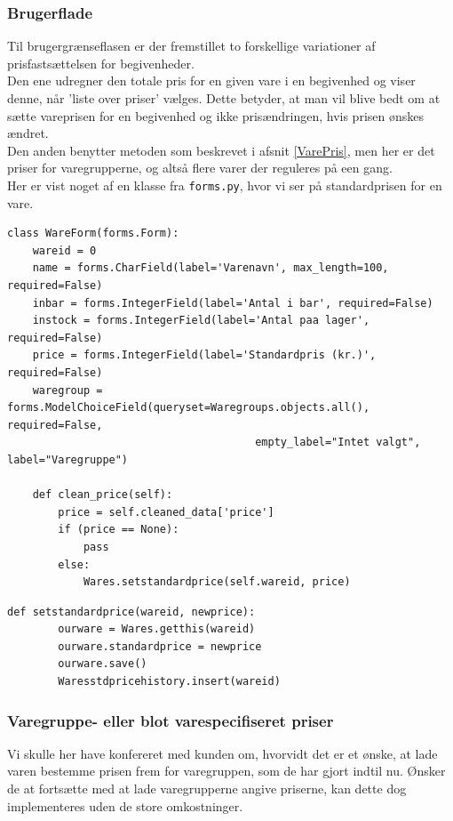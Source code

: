 \documentclass[]{article}
\begin{document}
\subsubsection{Brugerflade}
\noindent  Til brugergrænseflasen er der fremstillet to forskellige variationer af prisfastsættelsen for begivenheder. \\
Den ene udregner den totale pris for en given vare i en begivenhed og viser denne, når 'liste over priser' vælges. Dette betyder, at man vil blive bedt om at sætte vareprisen for en begivenhed og ikke prisændringen, hvis prisen ønskes ændret. \\
Den anden benytter metoden som beskrevet i afsnit \ref{VarePris}, men her er det priser for varegrupperne, og altså flere varer der reguleres på een gang. \\
Her er vist noget af en klasse fra \texttt{forms.py}, hvor vi ser på standardprisen for en vare.
\begin{lstlisting}
class WareForm(forms.Form):
    wareid = 0
    name = forms.CharField(label='Varenavn', max_length=100, required=False)
    inbar = forms.IntegerField(label='Antal i bar', required=False)
    instock = forms.IntegerField(label='Antal paa lager', required=False)
    price = forms.IntegerField(label='Standardpris (kr.)', required=False)
    waregroup = forms.ModelChoiceField(queryset=Waregroups.objects.all(), required=False, 
                                       empty_label="Intet valgt", label="Varegruppe")

    def clean_price(self):
        price = self.cleaned_data['price']
        if (price == None):
            pass
        else:
            Wares.setstandardprice(self.wareid, price)

\end{lstlisting}

\begin{lstlisting}
def setstandardprice(wareid, newprice):
        ourware = Wares.getthis(wareid)
        ourware.standardprice = newprice
        ourware.save()
        Waresstdpricehistory.insert(wareid)
\end{lstlisting}

\subsubsection{Varegruppe- eller blot varespecifiseret priser}
\noindent Vi skulle her have konfereret med kunden om, hvorvidt det er et ønske, at lade varen bestemme prisen frem for varegruppen, som de har gjort indtil nu. Ønsker de at fortsætte med at lade varegrupperne angive priserne, kan dette dog implementeres uden de store omkostninger.
\end{document}
